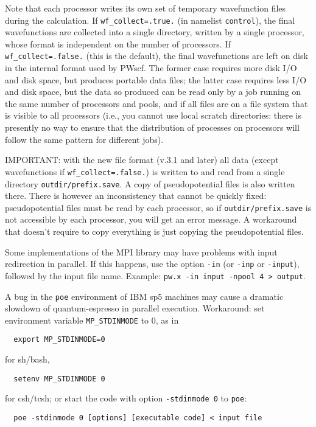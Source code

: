 \documentclass[12pt,a4paper]{article}
\begin{document}
Note that each processor writes its own set of temporary wavefunction
files during the calculation. If \texttt{wf\_collect=.true.} (in namelist
\texttt{control}), the final wavefunctions are collected into a single
directory, written by a single processor, whose format is independent 
on the number of processors. If \texttt{wf\_collect=.false.} (this is the
default), the final wavefunctions are left on disk in the internal format 
used by PWscf. The former case requires more disk I/O and disk space,
but produces portable data files; the latter case requires less I/O and
disk space, but the data so produced can be read only by a job running on
the same number of processors and pools, and if all files are on a
file system that is visible to all processors (i.e., you cannot use
local scratch directories: there is presently no way to ensure that
the distribution of processes on processors will follow the same
pattern for different jobs).

IMPORTANT: with the new file format (v.3.1 and later) all data 
(except wavefunctions if \texttt{wf\_collect=.false.}) is written
to and read from a single directory \texttt{outdir/prefix.save}. 
A copy of pseudopotential files is also written there. There is 
however an inconsistency that cannot be quickly fixed: pseudopotential 
files must be read by each processor, so if \texttt{outdir/prefix.save}
is not accessible by each processor, you will get an error message.
A workaround that doesn't require to copy everything is just copying
the pseudopotential files.

Some implementations of the MPI library may have problems with
input redirection in parallel.
If this happens, use the option \texttt{-in} (or \texttt{-inp} or
\texttt{-input}), followed by the input file name.
Example: \texttt{pw.x -in input -npool 4 > output}.

A bug in the \texttt{poe} environment of IBM sp5 machines
may cause a dramatic slowdown of quantum-espresso in parallel 
execution. Workaround: set environment variable 
\texttt{MP\_STDINMODE} to 0, as in
\begin{verbatim}
  export MP_STDINMODE=0
\end{verbatim}
for sh/bash,
\begin{verbatim}
  setenv MP_STDINMODE 0
\end{verbatim}
for csh/tcsh; or start the code with option \texttt{-stdinmode 0} to 
\texttt{poe}:
\begin{verbatim}
  poe -stdinmode 0 [options] [executable code] < input file
\end{verbatim}
\end{document}
